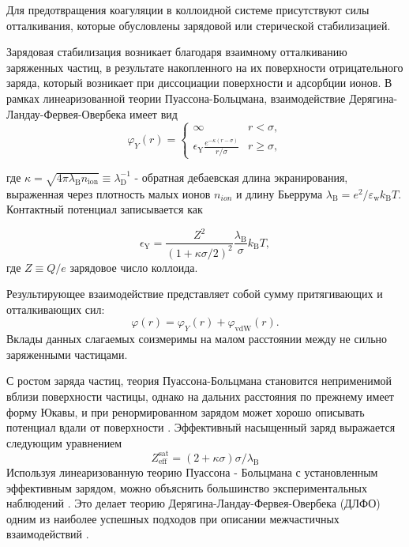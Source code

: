 Для предотвращения коагуляции в коллоидной системе присутствуют силы отталкивания, которые обусловлены зарядовой или стерической стабилизацией.

Зарядовая стабилизация возникает благодаря взаимному отталкиванию заряженных частиц, в результате накопленного на их поверхности отрицательного заряда, который возникает при диссоциации поверхности и адсорбции ионов. 
В рамках линеаризованной теории Пуассона-Больцмана, взаимодействие Дерягина-Ландау-Фервея-Овербека имеет вид \cite{Yur54}
\begin{equation}
\varphi_{Y}(r)=\left\{\begin{array}{ll}
\infty & r<\sigma, \\
\epsilon_{\mathrm{Y}} \frac{e^{-\kappa(r-\sigma)}}{r / \sigma} & r \geq \sigma,
\end{array}\right.
\end{equation}

где $\kappa=\sqrt{4 \pi \lambda_{\mathrm{B}} n_{\mathrm{ion}}} \equiv \lambda_{\mathrm{D}}^{-1}$ - обратная дебаевская длина экранирования, выраженная через плотность малых ионов $n_{ion}$ и длину Бьеррума $\lambda_{\mathrm{B}}=e^{2} / \varepsilon_{\mathrm{w}} k_{\mathrm{B}} T$. Контактный потенциал записывается как 

\begin{equation}
\epsilon_{\mathrm{Y}}=\frac{Z^{2}}{(1+\kappa \sigma / 2)^{2}} \frac{\lambda_{\mathrm{B}}}{\sigma} k_{\mathrm{B}} T,
\end{equation}
где $Z \equiv Q / e$ зарядовое число коллоида.

Результирующее взаимодействие представляет собой сумму притягивающих и отталкивающих сил:
\begin{equation}
\varphi(r)=\varphi_{Y}(r)+\varphi_{\mathrm{vdW}}(r).
\end{equation}
Вклады данных слагаемых соизмеримы на малом расстоянии между не сильно заряженными частицами.

С ростом заряда частиц, теория Пуассона-Больцмана становится неприменимой вблизи поверхности частицы, однако на дальних расстояния по прежнему имеет форму Юкавы, и при ренормированном зарядом может хорошо описывать потенциал вдали от поверхности \cite{Yur55}. Эффективный насыщенный заряд выражается следующим уравнением \cite{Yur56}
\begin{equation}
Z_{\mathrm{eff}}^{\mathrm{sat}}=(2+\kappa \sigma) \sigma / \lambda_{\mathrm{B}}
\end{equation}
Используя линеаризованную теорию Пуассона - Больцмана с установленным эффективным зарядом, можно объяснить большинство экспериментальных наблюдений \cite{Yur57, Yur58, Yur59}. Это делает теорию Дерягина-Ландау-Фервея-Овербека (ДЛФО) одним из наиболее успешных подходов при описании межчастичных взаимодействий \cite{Yur49, Yur60, Yur61}. 

